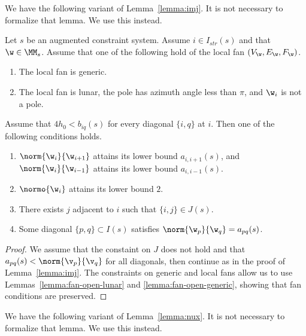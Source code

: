 We have the following variant of Lemma~\ref{lemma:imj}.
It is not necessary to formalize that lemma.  We use this instead.

\begin{lemma}
Let $s$ be an augmented constraint system.  Assume $i\in I_{str}(s)$ and
that $\w\in \MM_s$.  
Assume  that one of the following hold of the local fan $(V_\w,E_\w,F_\w)$.
\begin{enumerate}
\item The local fan is generic.
\item The local fan is lunar, the pole has azimuth
angle less than $\pi$, and $\w_i$ is not a pole.  
\end{enumerate}
Assume that $4h_0 < b_{iq}(s)$ for every diagonal $\{i,q\}$ at $i$.
Then one of the following conditions holds.
\begin{enumerate}
\item $\norm{\w_i}{\w_{i+1}}$ attains its lower bound $a_{i,i+1}(s)$, and
 $\norm{\w_i}{\w_{i-1}}$ attains its lower bound $a_{i,i-1}(s)$.
\item $\normo{\w_i}$ attains its lower bound $2$.
\item There exists $j$ adjacent to $i$ such that $\{i,j\}\in J(s)$.
\item Some diagonal $\{p,q\}\subset I(s)$ satisfies
$\norm{\w_p}{\w_q}=a_{p q}(s)$.
\end{enumerate}
\end{lemma}

\begin{proof} We assume that the constaint on $J$ does not hold and
that $a_{p q}(s)<\norm{\v_p}{\v_q}$ for all diagonals, then continue as in the proof of
Lemma~\ref{lemma:imj}.
The constraints on generic and local fans
allow us to use Lemmas~\ref{lemma:fan-open-lunar} and
\ref{lemma:fan-open-generic}, showing that fan conditions are preserved.
\end{proof}

We have the following variant of Lemma~\ref{lemma:nux}.
It is not necessary to formalize that lemma.  We use this instead.

